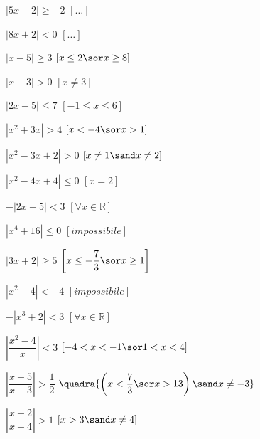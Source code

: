 \begin{esercizio}
\begin{multicols}{2}
\begin{enumeratea}
\item \(\left| 5x-2\right| \geq -2 \)
 \hfill \(\left[ \dots \right] \)
\item \(\left| 8x+2\right| < 0 \)
 \hfill \(\left[ \dots \right] \)
\item \(\left| x-5\right| \geq 3 \)
 \hfill \(\left[ x\leq 2 \sor x\geq 8 \right] \)
\item \(\left| x-3\right| >0 \)
 \hfill \(\left[ x\neq 3 \right] \)
\item \(\left| 2x-5\right| \leq 7 \)
 \hfill \(\left[ -1\leq x \leq 6 \right] \)
\item \(\left| x^2+3x\right| >4 \)
 \hfill \(\left[ x<-4 \sor x>1 \right] \)
\item \(\left| x^2-3x+2\right| >0 \)
 \hfill \(\left[ x\neq 1 \sand x\neq 2 \right] \)
\item \(\left| x^2-4x+4\right| \leq 0 \)
 \hfill \(\left[ x=2 \right] \)
\item \(-\left| 2x-5\right| <3 \)
 \hfill \(\left[ \forall x \in \mathbb{R} \right] \)
\item \(\left| x^4+16\right| \leq 0 \)
 \hfill \(\left[ impossibile \right] \)
\item \(\left| 3x+2\right| \geq 5 \)
 \hfill \(\left[ x\leq -\dfrac{7}{3} \sor x\geq 1 \right] \)
\item \(\left| x^2-4\right| <-4 \)
 \hfill \(\left[ impossibile \right] \)
\item \(-\left| x^3+2\right| <3 \)
 \hfill \(\left[ \forall x \in \mathbb{R} \right] \)
\item \(\left| \dfrac{x^2-4}{x}\right| <3 \)
 \hfill \(\left[ -4<x<-1 \sor 1<x<4 \right] \)
\item \(\left| \dfrac{x-5}{x+3}\right| >\dfrac{1}{2} \)
 \hfill \(\quadra{\left(x<\dfrac{7}{3} \sor x>13 \right) \sand x \neq -3}\)
\item \(\left| \dfrac{x-2}{x-4}\right| >1 \)
 \hfill \(\left[x>3 \sand x \neq 4 \right] \)
\end{enumeratea}
\end{multicols}
\end{esercizio}


